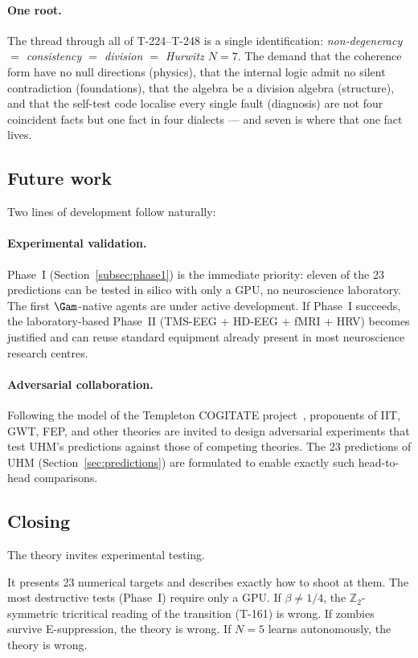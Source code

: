 \paragraph{One root.}
The thread through all of T-224--T-248 is a single identification:
\emph{non-degeneracy $=$ consistency $=$ division $=$ Hurwitz $N = 7$}. The demand
that the coherence form have no null directions (physics), that the internal logic
admit no silent contradiction (foundations), that the algebra be a division algebra
(structure), and that the self-test code localise every single fault (diagnosis)
are not four coincident facts but one fact in four dialects --- and seven is where
that one fact lives.

\subsection{Future work}

Two lines of development follow naturally:

\paragraph{Experimental validation.}
Phase~I (Section~\ref{subsec:phase1}) is the immediate priority: eleven of
the 23 predictions can be tested in silico with only a GPU, no
neuroscience laboratory. The first $\Gam$-native agents are under active
development. If Phase~I succeeds, the laboratory-based Phase~II
(TMS-EEG + HD-EEG + fMRI + HRV) becomes justified and can reuse standard
equipment already present in most neuroscience research centres.

\paragraph{Adversarial collaboration.}
Following the model of the Templeton COGITATE project~\cite{cogitate2025},
proponents of IIT, GWT, FEP, and other theories are invited to design
adversarial experiments that test UHM's predictions against those of
competing theories. The 23 predictions of UHM
(Section~\ref{sec:predictions}) are formulated to enable exactly such
head-to-head comparisons.

\subsection{Closing}

The theory invites experimental testing.

It presents 23 numerical targets and describes exactly how to shoot at them.
The most destructive tests (Phase~I) require only a GPU. If $\beta \neq 1/4$, the
$\mathbb{Z}_2$-symmetric tricritical reading of the transition (T-161) is wrong. If
zombies survive E-suppression, the theory is wrong. If $N = 5$ learns
autonomously, the theory is wrong.

